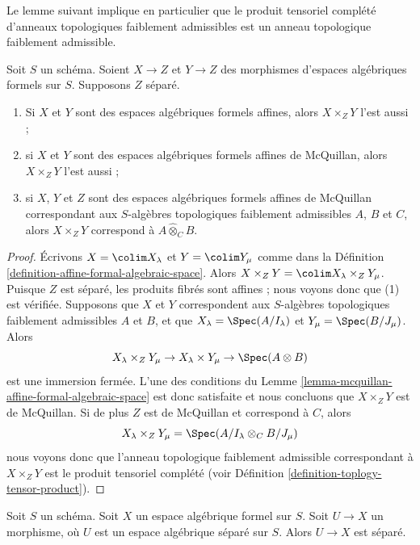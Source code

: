 \noindent
Le lemme suivant implique en particulier que le produit tensoriel
complété d'anneaux topologiques faiblement admissibles est
un anneau topologique faiblement admissible.

\begin{lemma}
\label{lemma-fibre-product-affines-over-separated}
Soit $S$ un schéma. Soient $X \to Z$ et $Y \to Z$ des morphismes
d'espaces algébriques formels sur $S$. Supposons $Z$ séparé.
\begin{enumerate}
\item Si $X$ et $Y$ sont des espaces algébriques formels affines, alors
$X \times_Z Y$ l'est aussi ;
\item si $X$ et $Y$ sont des espaces algébriques formels affines de McQuillan, alors
$X \times_Z Y$ l'est aussi ;
\item si $X$, $Y$ et $Z$ sont des espaces algébriques formels affines de McQuillan
correspondant aux $S$-algèbres topologiques faiblement admissibles
$A$, $B$ et $C$, alors $X \times_Z Y$ correspond à
$A \widehat{\otimes}_C B$.
\end{enumerate}
\end{lemma}

\begin{proof}
Écrivons $X = \colim X_\lambda$ et $Y = \colim Y_\mu$ comme
dans la Définition \ref{definition-affine-formal-algebraic-space}.
Alors $X \times_Z Y = \colim X_\lambda \times_Z Y_\mu$.
Puisque $Z$ est séparé, les produits fibrés sont affines ;
nous voyons donc que (1) est vérifiée. Supposons que $X$ et $Y$ correspondent
aux $S$-algèbres topologiques faiblement admissibles $A$ et $B$,
et que $X_\lambda = \Spec(A/I_\lambda)$ et $Y_\mu = \Spec(B/J_\mu)$.
Alors
$$
X_\lambda \times_Z Y_\mu \to
X_\lambda \times Y_\mu \to \Spec(A \otimes B)
$$
est une immersion fermée. L'une des conditions du
Lemme \ref{lemma-mcquillan-affine-formal-algebraic-space}
est donc satisfaite et nous concluons que $X \times_Z Y$ est de McQuillan.
Si de plus $Z$ est de McQuillan et correspond à $C$, alors
$$
X_\lambda \times_Z Y_\mu = \Spec(A/I_\lambda \otimes_C B/J_\mu)
$$
nous voyons donc que l'anneau topologique faiblement admissible
correspondant à $X \times_Z Y$ est le produit tensoriel complété
(voir Définition \ref{definition-toplogy-tensor-product}).
\end{proof}

\begin{lemma}
\label{lemma-separated-from-separated}
Soit $S$ un schéma. Soit $X$ un espace algébrique formel sur $S$.
Soit $U \to X$ un morphisme, où $U$ est un espace algébrique
séparé sur $S$. Alors $U \to X$ est séparé.
\end{lemma}

